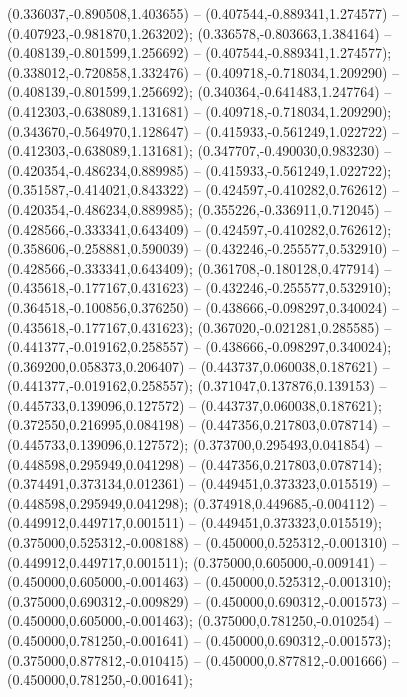  (0.336037,-0.890508,1.403655) -- (0.407544,-0.889341,1.274577) -- (0.407923,-0.981870,1.263202);
 (0.336578,-0.803663,1.384164) -- (0.408139,-0.801599,1.256692) -- (0.407544,-0.889341,1.274577);
 (0.338012,-0.720858,1.332476) -- (0.409718,-0.718034,1.209290) -- (0.408139,-0.801599,1.256692);
 (0.340364,-0.641483,1.247764) -- (0.412303,-0.638089,1.131681) -- (0.409718,-0.718034,1.209290);
 (0.343670,-0.564970,1.128647) -- (0.415933,-0.561249,1.022722) -- (0.412303,-0.638089,1.131681);
 (0.347707,-0.490030,0.983230) -- (0.420354,-0.486234,0.889985) -- (0.415933,-0.561249,1.022722);
 (0.351587,-0.414021,0.843322) -- (0.424597,-0.410282,0.762612) -- (0.420354,-0.486234,0.889985);
 (0.355226,-0.336911,0.712045) -- (0.428566,-0.333341,0.643409) -- (0.424597,-0.410282,0.762612);
 (0.358606,-0.258881,0.590039) -- (0.432246,-0.255577,0.532910) -- (0.428566,-0.333341,0.643409);
 (0.361708,-0.180128,0.477914) -- (0.435618,-0.177167,0.431623) -- (0.432246,-0.255577,0.532910);
 (0.364518,-0.100856,0.376250) -- (0.438666,-0.098297,0.340024) -- (0.435618,-0.177167,0.431623);
 (0.367020,-0.021281,0.285585) -- (0.441377,-0.019162,0.258557) -- (0.438666,-0.098297,0.340024);
 (0.369200,0.058373,0.206407) -- (0.443737,0.060038,0.187621) -- (0.441377,-0.019162,0.258557);
 (0.371047,0.137876,0.139153) -- (0.445733,0.139096,0.127572) -- (0.443737,0.060038,0.187621);
 (0.372550,0.216995,0.084198) -- (0.447356,0.217803,0.078714) -- (0.445733,0.139096,0.127572);
 (0.373700,0.295493,0.041854) -- (0.448598,0.295949,0.041298) -- (0.447356,0.217803,0.078714);
 (0.374491,0.373134,0.012361) -- (0.449451,0.373323,0.015519) -- (0.448598,0.295949,0.041298);
 (0.374918,0.449685,-0.004112) -- (0.449912,0.449717,0.001511) -- (0.449451,0.373323,0.015519);
 (0.375000,0.525312,-0.008188) -- (0.450000,0.525312,-0.001310) -- (0.449912,0.449717,0.001511);
 (0.375000,0.605000,-0.009141) -- (0.450000,0.605000,-0.001463) -- (0.450000,0.525312,-0.001310);
 (0.375000,0.690312,-0.009829) -- (0.450000,0.690312,-0.001573) -- (0.450000,0.605000,-0.001463);
 (0.375000,0.781250,-0.010254) -- (0.450000,0.781250,-0.001641) -- (0.450000,0.690312,-0.001573);
 (0.375000,0.877812,-0.010415) -- (0.450000,0.877812,-0.001666) -- (0.450000,0.781250,-0.001641);
